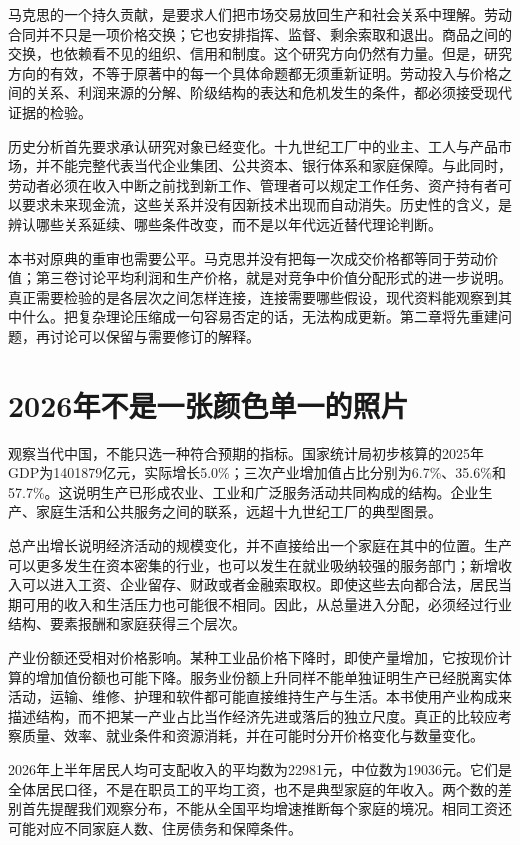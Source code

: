\documentclass[UTF8,fontset=fandol,zihao=-4,oneside,openany]{ctexbook}
\begin{document}
马克思的一个持久贡献，是要求人们把市场交易放回生产和社会关系中理解。劳动合同并不只是一项价格交换；它也安排指挥、监督、剩余索取和退出。商品之间的交换，也依赖看不见的组织、信用和制度。这个研究方向仍然有力量。但是，研究方向的有效，不等于原著中的每一个具体命题都无须重新证明。劳动投入与价格之间的关系、利润来源的分解、阶级结构的表达和危机发生的条件，都必须接受现代证据的检验。\cite{Marx1,Marx2,Marx3}

\label{arg:P003}
历史分析首先要求承认研究对象已经变化。十九世纪工厂中的业主、工人与产品市场，并不能完整代表当代企业集团、公共资本、银行体系和家庭保障。与此同时，劳动者必须在收入中断之前找到新工作、管理者可以规定工作任务、资产持有者可以要求未来现金流，这些关系并没有因新技术出现而自动消失。历史性的含义，是辨认哪些关系延续、哪些条件改变，而不是以年代远近替代理论判断。

本书对原典的重审也需要公平。马克思并没有把每一次成交价格都等同于劳动价值；第三卷讨论平均利润和生产价格，就是对竞争中价值分配形式的进一步说明。真正需要检验的是各层次之间怎样连接，连接需要哪些假设，现代资料能观察到其中什么。把复杂理论压缩成一句容易否定的话，无法构成更新。第二章将先重建问题，再讨论可以保留与需要修订的解释。\cite{MarxPrice}

\section{2026年不是一张颜色单一的照片}
观察当代中国，不能只选一种符合预期的指标。国家统计局初步核算的2025年GDP为1401879亿元，实际增长5.0\%；三次产业增加值占比分别为6.7\%、35.6\%和57.7\%。这说明生产已形成农业、工业和广泛服务活动共同构成的结构。企业生产、家庭生活和公共服务之间的联系，远超十九世纪工厂的典型图景。\cite{NBS2025}

\label{arg:P004}
总产出增长说明经济活动的规模变化，并不直接给出一个家庭在其中的位置。生产可以更多发生在资本密集的行业，也可以发生在就业吸纳较强的服务部门；新增收入可以进入工资、企业留存、财政或者金融索取权。即使这些去向都合法，居民当期可用的收入和生活压力也可能很不相同。因此，从总量进入分配，必须经过行业结构、要素报酬和家庭获得三个层次。

产业份额还受相对价格影响。某种工业品价格下降时，即使产量增加，它按现价计算的增加值份额也可能下降。服务业份额上升同样不能单独证明生产已经脱离实体活动，运输、维修、护理和软件都可能直接维持生产与生活。本书使用产业构成来描述结构，而不把某一产业占比当作经济先进或落后的独立尺度。真正的比较应考察质量、效率、就业条件和资源消耗，并在可能时分开价格变化与数量变化。

2026年上半年居民人均可支配收入的平均数为22981元，中位数为19036元。它们是全体居民口径，不是在职员工的平均工资，也不是典型家庭的年收入。两个数的差别首先提醒我们观察分布，不能从全国平均增速推断每个家庭的境况。相同工资还可能对应不同家庭人数、住房债务和保障条件。\cite{Income2026}
\end{document}
